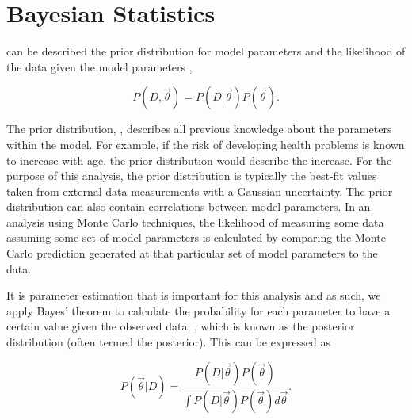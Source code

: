 \section{Bayesian Statistics}
\label{sec:MarkovChainMonteCarlo_BayesianStatistics}

  can be described   the prior distribution for model parameters  and the likelihood of the data given the model parameters ,

\begin{equation}
  P(D,\vec{\theta}) = P(D|\vec{\theta})P(\vec{\theta}).
\end{equation}

The prior distribution, , describes all previous knowledge about the parameters within the model. For example, if the risk of developing health problems is known to increase with age, the prior distribution would describe the increase. For the purpose of this analysis, the prior distribution is typically the best-fit values taken from external data measurements with a Gaussian uncertainty. The prior distribution can also contain correlations between model parameters. In an analysis using Monte Carlo techniques, the likelihood of measuring some data assuming some set of model parameters is calculated by comparing the Monte Carlo prediction generated at that particular set of model parameters to the data.

It is parameter estimation that is important for this analysis and as such, we apply Bayes' theorem \cite{Bayes:1764vd} to calculate the probability for each parameter to have a certain value given the observed data, , which is known as the posterior distribution (often termed the posterior). This can be expressed as

\begin{equation}
  \label{eq:MarkovChainMonteCarlo_PosteriorDistribution}
  P(\vec{\theta}|D) = \frac{ P(D|\vec{\theta}) P(\vec{\theta}) }{\int P(D|\vec{\theta}) P(\vec{\theta}) d\vec{\theta}}.
\end{equation}

